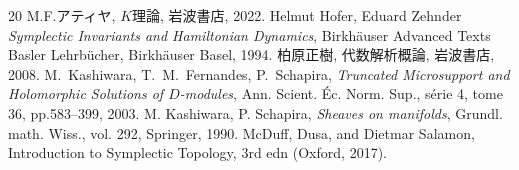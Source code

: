 \begin{thebibliography}{20} 
  M.F.アティヤ, \(K\)理論, 岩波書店, 2022.
  Helmut Hofer, Eduard Zehnder
  \textit{Symplectic Invariants and Hamiltonian Dynamics}, 
  Birkh\"auser Advanced Texts Basler Lehrb\"ucher, Birkh\"auser Basel, 1994.
  柏原正樹, 代数解析概論, 岩波書店, 2008.
   M.~Kashiwara, T.~M.~Fernandes, 
	P.~Schapira, 
	\textit{Truncated Microsupport and Holomorphic Solutions 
	of \(D\)-modules}, 
	Ann. Scient. \'Ec. Norm. Sup., s\'erie 4, tome 36, 
	pp.583--399, 2003.
	 M. Kashiwara, P. Schapira, \emph{Sheaves on manifolds}, Grundl. math. Wiss., vol. 292, Springer, 1990.
     McDuff, Dusa, 
    and Dietmar Salamon, 
    Introduction to Symplectic Topology, 
    3rd edn (Oxford, 2017).
\end{thebibliography}





